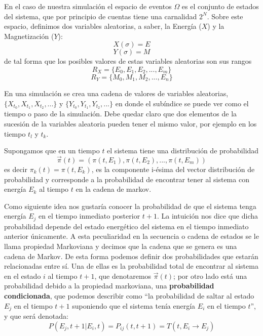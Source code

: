 \documentclass[12pt]{book}
\begin{document}
En el caso de nuestra simulación el espacio de eventos $\Omega$ es el conjunto de estados del sistema, que por principio de cuentas tiene una carnalidad $2^{N}$.
Sobre este espacio, definimos dos variables aleatorias, a saber, la Energía ($X$) y la Magnetización ($Y$):
\begin{equation}
X(\sigma) = E
\end{equation}
\begin{equation}
Y(\sigma) = M
\end{equation}
de tal forma que los posibles valores de estas variables aleatorias son sus rangos
\begin{equation}
R_{X} = \{E_{0}, E_{1}, E_{2}, ..., E_{m} \}
\end{equation}
\begin{equation}
R_{Y} = \{M_{0}, M_{1}, M_{2}, ..., E_{n} \}
\end{equation}

En una simulación se crea una cadena de valores de variables aleatorias, $\{X_{t_{0}},X_{t_{1}},X_{t_{2}},...\}$ y $\{Y_{t_{0}},Y_{t_{1}},Y_{t_{2}},...\}$ en donde el subíndice se puede ver como el tiempo o paso de la simulación. Debe quedar claro que dos elementos de la sucesión de la variables aleatoria pueden tener el mismo valor, por ejemplo en los tiempo $t_{l}$ y $t_{k}$.

Supongamos que en un tiempo $t$ el sistema tiene una distribución de probabilidad 
\begin{equation}
	\vec{\pi}(t) = (\pi(t,E_{1}), \pi(t,E_{2}),...,\pi(t,E_{m}) )
\end{equation}
es decir $\pi_{k}(t)=\pi(t,E_{k})$, es la componente i-ésima  del vector distribución de probabilidad y corresponde a la probabilidad de encontrar tener al sistema con energía $E_{k}$ al tiempo $t$ en la cadena de markov.


Como siguiente idea nos gustaría conocer la probabilidad de que el sistema tenga energía $E_{j}$ en el tiempo inmediato posterior $t+1$. La intuición nos dice que dicha probabilidad depende del estado energético del sistema en el tiempo inmediato anterior únicamente. A esta peculiaridad en la secuencia o cadena de estados se le llama propiedad Markoviana y decimos que la cadena que se genera es una cadena de Markov. De esta forma podemos definir dos probabilidades que estarán relacionadas entre sí. Una de ellas es la probabilidad total de encontrar al sistema en el estado $i$ al tiempo $t+1$, que denotaremos $\vec{\pi}(t)$; por otro lado está una probabilidad debido a la propiedad markoviana, una \textbf{probabilidad condicionada}, que podemos describir como ``la probabilidad de saltar al estado $E_{j}$ en el tiempo $t+1$ suponiendo que el sistema tenía energía $E_{i}$ en el tiempo $t$'', y que será denotada:
\begin{equation}
	P(E_{j},t+1 | E_{i}, t) = P_{ij}(t,t+1) = T(t, E_{i}\rightarrow E_{j})
\end{equation}
\end{document}
